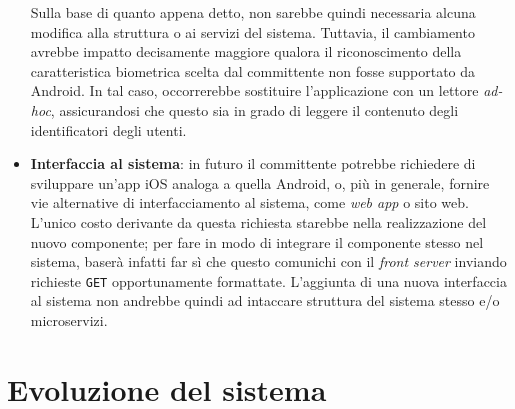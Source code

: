 \documentclass[a4paper,12pt]{report}
\begin{document}
\begin{itemize}
	Sulla base di quanto appena detto, non sarebbe quindi necessaria alcuna modifica alla struttura o ai servizi del sistema. Tuttavia, il cambiamento avrebbe impatto decisamente maggiore qualora il riconoscimento della caratteristica biometrica scelta dal committente non fosse supportato da Android. In tal caso, occorrerebbe sostituire l'applicazione con un lettore \emph{ad-hoc}, assicurandosi che questo sia in grado di leggere il contenuto degli identificatori degli utenti.
	
	\item \textbf{Interfaccia al sistema}: in futuro il committente potrebbe richiedere di sviluppare un'app iOS analoga a quella Android, o, più in generale, fornire vie alternative di interfacciamento al sistema, come \emph{web app} o sito web. L'unico costo derivante da questa richiesta starebbe nella realizzazione del nuovo componente; per fare in modo di integrare il componente stesso nel sistema, baserà infatti far sì che questo comunichi con il \emph{front server} inviando richieste \texttt{GET} opportunamente formattate. L'aggiunta di una nuova interfaccia al sistema non andrebbe quindi ad intaccare struttura del sistema stesso e/o microservizi.
\end{itemize}

\section{Evoluzione del sistema}
\end{document}
